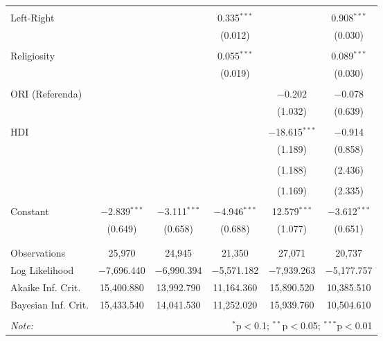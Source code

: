 \begin{table}[!htbp]
\begin{tabular}{@{\extracolsep{5pt}}lccccc}
  & & & & & \\ 
 Left-Right &  &  & 0.335$^{***}$ &  & 0.908$^{***}$ \\ 
  &  &  & (0.012) &  & (0.030) \\ 
  & & & & & \\ 
 Religiosity &  &  & 0.055$^{***}$ &  & 0.089$^{***}$ \\ 
  &  &  & (0.019) &  & (0.030) \\ 
  & & & & & \\ 
 ORI (Referenda) &  &  &  & $-$0.202 & $-$0.078 \\ 
  &  &  &  & (1.032) & (0.639) \\ 
  & & & & & \\ 
 HDI &  &  &  & $-$18.615$^{***}$ & $-$0.914 \\ 
  &  &  &  & (1.189) & (0.858) \\ 
  & & & & & \\ 
  &  &  &  & (1.188) & (2.436) \\ 
  & & & & & \\ 
  &  &  &  & (1.169) & (2.335) \\ 
  & & & & & \\ 
 Constant & $-$2.839$^{***}$ & $-$3.111$^{***}$ & $-$4.946$^{***}$ & 12.579$^{***}$ & $-$3.612$^{***}$ \\ 
  & (0.649) & (0.658) & (0.688) & (1.077) & (0.651) \\ 
  & & & & & \\ 
\hline \\[-1.8ex] 
Observations & 25,970 & 24,945 & 21,350 & 27,071 & 20,737 \\ 
Log Likelihood & $-$7,696.440 & $-$6,990.394 & $-$5,571.182 & $-$7,939.263 & $-$5,177.757 \\ 
Akaike Inf. Crit. & 15,400.880 & 13,992.790 & 11,164.360 & 15,890.520 & 10,385.510 \\ 
Bayesian Inf. Crit. & 15,433.540 & 14,041.530 & 11,252.020 & 15,939.760 & 10,504.610 \\ 
\hline 
\hline \\[-1.8ex] 
\textit{Note:}  & \multicolumn{5}{r}{$^{*}$p$<$0.1; $^{**}$p$<$0.05; $^{***}$p$<$0.01} \\ 
\end{tabular} 
\end{table} 
